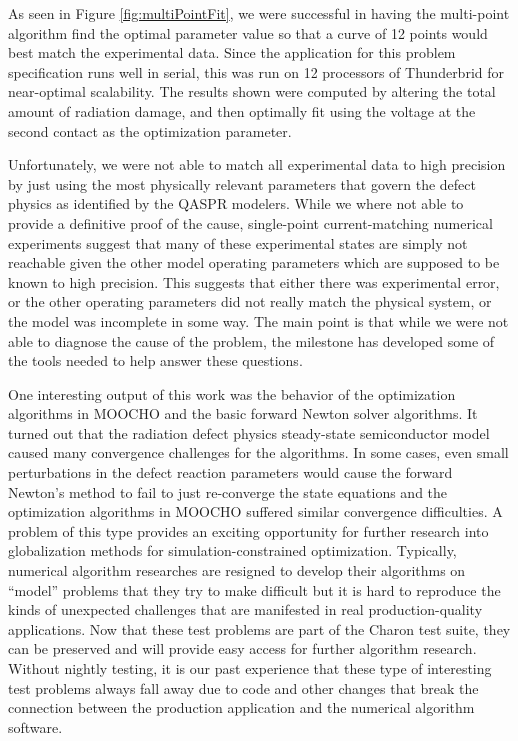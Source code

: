 \documentclass[pdf,ps2pdf,11pt]{SANDreport}
\begin{document}

As seen in Figure {}\ref{fig:multiPointFit}, we were successful in having the
multi-point algorithm find the optimal parameter value so that a curve of 12
points would best match the experimental data. Since the application for this
problem specification runs well in serial, this was run on 12 processors of
Thunderbrid for near-optimal scalability.  The results shown were computed by
altering the total amount of radiation damage, and then optimally fit using
the voltage at the second contact as the optimization parameter.

Unfortunately, we were not able to match all experimental data to high
precision by just using the most physically relevant parameters that govern
the defect physics as identified by the QASPR modelers.  While we where not
able to provide a definitive proof of the cause, single-point current-matching
numerical experiments suggest that many of these experimental states are
simply not reachable given the other model operating parameters which are
supposed to be known to high precision.  This suggests that either there was
experimental error, or the other operating parameters did not really match the
physical system, or the model was incomplete in some way.  The main point is
that while we were not able to diagnose the cause of the problem, the
milestone has developed some of the tools needed to help answer these
questions.


One interesting output of this work was the behavior of the optimization
algorithms in MOOCHO and the basic forward Newton solver algorithms.  It turned out
that the radiation defect physics steady-state semiconductor model caused many
convergence challenges for the algorithms.  In some cases, even small
perturbations in the defect reaction parameters would cause the forward
Newton's method to fail to just re-converge the state equations and the
optimization algorithms in MOOCHO suffered similar convergence difficulties.
A problem of this type provides an exciting opportunity for further
research into globalization methods for simulation-constrained optimization.
Typically, numerical algorithm researches are resigned to develop their
algorithms on ``model'' problems that they try to make difficult but it is
hard to reproduce the kinds of unexpected challenges that are manifested in
real production-quality applications.  Now that these test
problems are part of the Charon test suite, they can be preserved and will
provide easy access for further algorithm research.  Without nightly testing,
it is our past experience that these type of interesting test problems always
fall away due to code and other changes that break the connection between the
production application and the numerical algorithm software.
\end{document}
